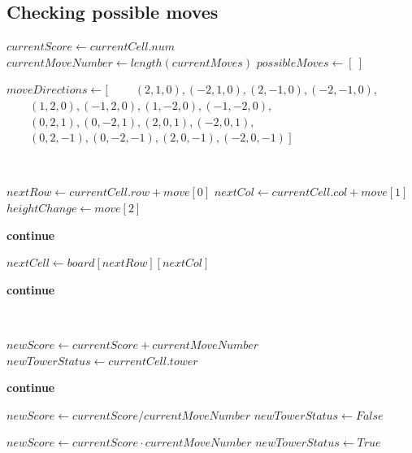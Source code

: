 \documentclass{article}
\begin{document}
\subsection{Checking possible moves}


\begin{algorithm}[H]
\caption{Generate possible moves}
\begin{algorithmic}


\State $currentScore \gets currentCell.num$
\State $currentMoveNumber \gets length(currentMoves)$
\State $possibleMoves \gets [\ ]$

\State $moveDirections \gets [$
\Statex $\qquad (2,1,0),(-2,1,0),(2,-1,0),(-2,-1,0),$
\Statex $\qquad (1,2,0),(-1,2,0),(1,-2,0),(-1,-2,0),$
\Statex $\qquad (0,2,1),(0,-2,1),(2,0,1),(-2,0,1),$
\Statex $\qquad (0,2,-1),(0,-2,-1),(2,0,-1),(-2,0,-1)\ ]$

\


    \State $nextRow \gets currentCell.row + move[0]$
    \State $nextCol \gets currentCell.col + move[1]$
    \State $heightChange \gets move[2]$

        \State \textbf{continue}
    \EndIf

    \State $nextCell \gets board[nextRow][nextCol]$

        \State \textbf{continue}
    \EndIf

    \


        \State $newScore \gets currentScore + currentMoveNumber$
        \State $newTowerStatus \gets currentCell.tower$


            \State \textbf{continue}
        \EndIf

        \State $newScore \gets currentScore/currentMoveNumber$
        \State $newTowerStatus \gets False$


        \State $newScore \gets currentScore \cdot currentMoveNumber$
        \State $newTowerStatus \gets True$


\end{algorithmic}
\end{algorithm}
\end{document}
